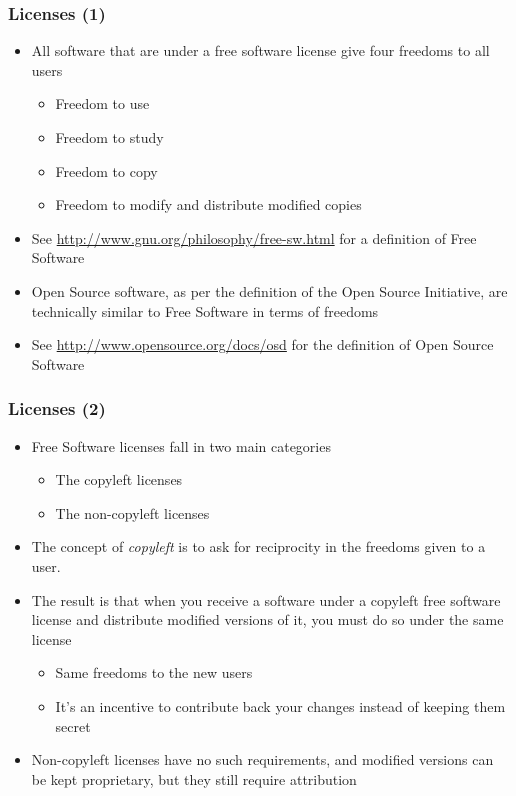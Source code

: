 \begin{frame}
  \frametitle{Licenses (1)}
  \begin{itemize}
  \item All software that are under a free software license give four
    freedoms to all users
    \begin{itemize}
    \item Freedom to use
    \item Freedom to study
    \item Freedom to copy
    \item Freedom to modify and distribute modified copies
    \end{itemize}
  \item See \url{http://www.gnu.org/philosophy/free-sw.html} for a
    definition of Free Software
  \item Open Source software, as per the definition of the Open Source
    Initiative, are technically similar to Free Software in terms of
    freedoms
  \item See \url{http://www.opensource.org/docs/osd} for the definition of
    Open Source Software
  \end{itemize}
\end{frame}

\begin{frame}
  \frametitle{Licenses (2)}
  \begin{itemize}
  \item Free Software licenses fall in two main categories
    \begin{itemize}
    \item The copyleft licenses
    \item The non-copyleft licenses
    \end{itemize}
  \item The concept of {\em copyleft} is to ask for reciprocity in the
    freedoms given to a user.
  \item The result is that when you receive a software under a
    copyleft free software license and distribute modified versions of
    it, you must do so under the same license
    \begin{itemize}
    \item Same freedoms to the new users
    \item It's an incentive to contribute back your changes instead of
      keeping them secret
    \end{itemize}
  \item Non-copyleft licenses have no such requirements, and modified
    versions can be kept proprietary, but they still require
    attribution
  \end{itemize}
\end{frame}

